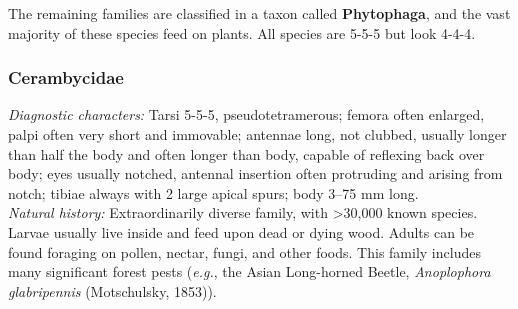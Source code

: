 \documentclass[letterpaper, 11pt]{article}
\begin{document}
\noindent{}The remaining families are classified in a taxon called \textbf{Phytophaga}, and the vast majority of these species feed on plants. All species are 5-5-5 but look 4-4-4. 

\subsubsection{Cerambycidae}
\noindent{}\textit{Diagnostic characters:} Tarsi 5-5-5, pseudotetramerous; femora often enlarged, palpi often very short and immovable; antennae long, not clubbed, usually longer than half the body and often longer than body, capable of reflexing back over body; eyes usually notched, antennal insertion often protruding and arising from notch; tibiae always with 2 large apical spurs; body 3--75 mm long.\\

\noindent{}\textit{Natural history:} Extraordinarily diverse family, with \textgreater30,000 known species. Larvae usually live inside and feed upon dead or dying wood. Adults can be found foraging on pollen, nectar, fungi, and other foods. This family includes many significant forest pests (\textit{e.g.}, the Asian Long-horned Beetle, \textit{Anoplophora glabripennis} (Motschulsky, 1853)).\\
\end{document}
